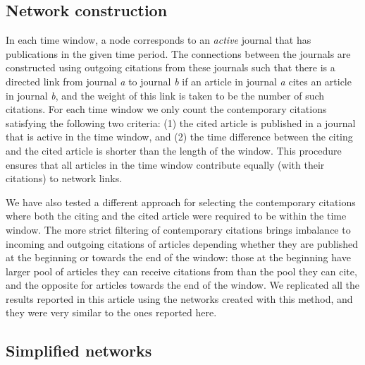 \documentclass[a4paper,12pt]{article}
\begin{document}
\subsection{Network construction}
\label{sec:data_networks}

In each time window, a node corresponds to an \emph{active} journal that has publications in the given time period. 
The connections between the journals are constructed using outgoing citations from these journals such that there is a directed link from 
journal \emph{a} to journal \emph{b} if an article in journal \emph{a} cites an article in journal \emph{b}, and the weight of this link is taken to be the number of such citations. For each time window we only count the contemporary citations satisfying the following two criteria:
(1) the cited article is published in a journal that is active in the time window, and 
(2) the time difference between the citing and the cited article is shorter than the length of the window. 
This procedure ensures that all articles in the time window contribute equally (with their citations) to network links. 

We have also tested a different approach for selecting the contemporary citations where both the citing and the cited article were required to be within the time window.
The more strict filtering of contemporary citations brings imbalance to incoming and outgoing citations of articles depending whether they are published at the beginning or towards the end of the window: those at the beginning 
have larger pool of articles they can receive citations from than the pool they can cite, 
and the opposite for articles towards the end of the window. We replicated all the results reported in this article using the networks created with this method, and they were very similar to the ones reported here.

\subsection{Simplified networks}
\label{sec:data_simple}
\end{document}
